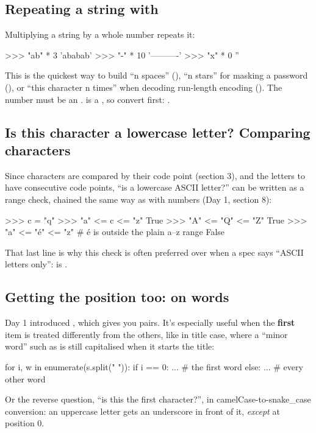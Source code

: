 \documentclass[10pt,a4paper]{article}
\begin{document}
\subsection{Repeating a string with \code{*}}
Multiplying a string by a whole number repeats it:
\begin{txtcode}
>>> "ab" * 3
'ababab'
>>> "-" * 10
'----------'
>>> "x" * 0
''
\end{txtcode}
This is the quickest way to build “n spaces” (), “n stars” for masking a password (), or “this character n times” when decoding run-length encoding (). The number must be an .  is a , so convert first: .
\subsection{Is this character a lowercase letter? Comparing characters}
Since characters are compared by their code point (section 3), and the letters  to  have consecutive code points, “is  a lowercase ASCII letter?” can be written as a range check, chained the same way as with numbers (Day 1, section 8):
\begin{txtcode}
>>> c = "q"
>>> "a" <= c <= "z"
True
>>> "A" <= "Q" <= "Z"
True
>>> "a" <= "é" <= "z"         # é is outside the plain a–z range
False
\end{txtcode}
That last line is why this check is often preferred over  when a spec says “ASCII letters only”:  is .
\subsection{Getting the position too:  on words}
Day 1 introduced , which gives you  pairs. It’s especially useful when the \textbf{first} item is treated differently from the others, like in title case, where a “minor word” such as  is still capitalised when it starts the title:
\begin{pycode}
for i, w in enumerate(s.split(" ")):
    if i == 0:
        ...      # the first word
    else:
        ...      # every other word
\end{pycode}
Or the reverse question, “is this the first character?”, in camelCase-to-snake\_case conversion: an uppercase letter gets an underscore in front of it, \emph{except} at position 0.
\end{document}
